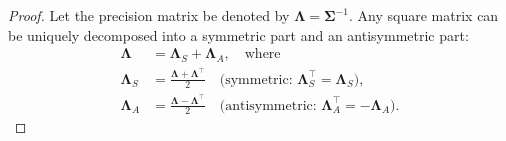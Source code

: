 \documentclass[../main.tex]{subfiles}
\begin{document}
\begin{proof}
    
Let the precision matrix be denoted by $\boldsymbol{\Lambda} = \boldsymbol{\Sigma}^{-1}$. Any square matrix can be uniquely decomposed into a symmetric part and an antisymmetric part:
\begin{align*}
\boldsymbol{\Lambda} &= \boldsymbol{\Lambda}_S + \boldsymbol{\Lambda}_A, \quad \text{where} \\
\boldsymbol{\Lambda}_S &= \frac{\boldsymbol{\Lambda} + \boldsymbol{\Lambda}^\top}{2} \quad \text{(symmetric: $\boldsymbol{\Lambda}_S^\top = \boldsymbol{\Lambda}_S$)}, \\
\boldsymbol{\Lambda}_A &= \frac{\boldsymbol{\Lambda} - \boldsymbol{\Lambda}^\top}{2} \quad \text{(antisymmetric: $\boldsymbol{\Lambda}_A^\top = -\boldsymbol{\Lambda}_A$)}.
\end{align*}


\end{proof}
\end{document}
